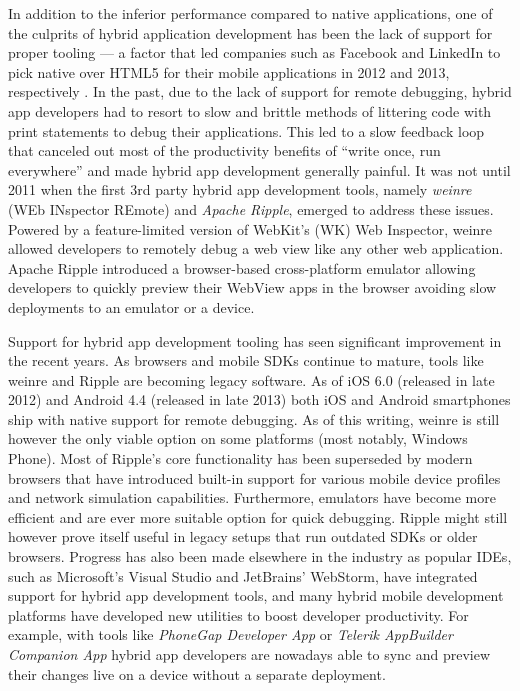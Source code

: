 \documentclass[thesis.tex]{subfiles}
\begin{document}
In addition to the inferior performance compared to native applications, one of the culprits of hybrid application development has been the lack of support for proper tooling --- a factor that led companies such as Facebook and LinkedIn to pick native over HTML5 for their mobile applications in 2012 and 2013, respectively \cite{html_vs_native_facebook}\cite{html_vs_native_linkedin}. In the past, due to the lack of support for remote debugging, hybrid app developers had to resort to slow and brittle methods of littering code with print statements to debug their applications. This led to a slow feedback loop that canceled out most of the productivity benefits of ``write once, run everywhere'' and made hybrid app development generally painful. It was not until 2011 when the first 3rd party hybrid app development tools, namely \textit{weinre} (WEb INspector REmote) and \textit{Apache Ripple}, emerged to address these issues. Powered by a feature-limited version of WebKit's (WK) Web Inspector, weinre allowed developers to remotely debug a web view like any other web application. Apache Ripple introduced a browser-based cross-platform emulator allowing developers to quickly preview their WebView apps in the browser avoiding slow deployments to an emulator or a device.

Support for hybrid app development tooling has seen significant improvement in the recent years. As browsers and mobile SDKs continue to mature, tools like weinre and Ripple are becoming legacy software. As of iOS 6.0 (released in late 2012) and Android 4.4 (released in late 2013) both iOS and Android smartphones ship with native support for remote debugging. As of this writing, weinre is still however the only viable option on some platforms (most notably, Windows Phone). Most of Ripple's core functionality has been superseded by modern browsers that have introduced built-in support for various mobile device profiles and network simulation capabilities. Furthermore, emulators have become more efficient and are ever more suitable option for quick debugging. Ripple might still however prove itself useful in legacy setups that run outdated SDKs or older browsers. Progress has also been made elsewhere in the industry as popular IDEs, such as Microsoft's Visual Studio and JetBrains' WebStorm, have integrated support for hybrid app development tools, and many hybrid mobile development platforms have developed new utilities to boost developer productivity. For example, with tools like \textit{PhoneGap Developer App} or \textit{Telerik AppBuilder Companion App} hybrid app developers are nowadays able to sync and preview their changes live on a device without a separate deployment.
\end{document}
